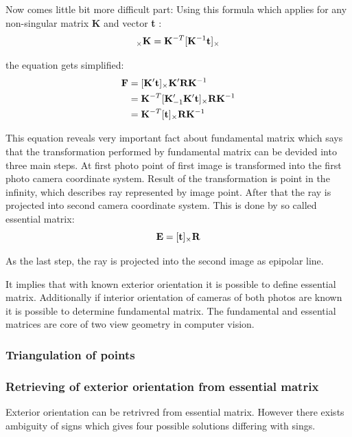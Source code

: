 \documentclass[a4paper,12pt]{report}
\newcommand{\ematr}[1]{
{\bf #1}
}
\newcommand{\evect}[1]{
{\bf #1}
}
\begin{document}
Now comes little bit more difficult part:
Using this formula which applies for any non-singular matrix \ematr{K} and vector \evect{t}:
\begin{equation}
[\evect{t}]_{\times} \ematr{K} = \ematr{K}^{-T}[\ematr{K}^{-1}\evect{t}]_{\times}
\end{equation}

the equation gets simplified:
\begin{equation}
\begin{split}
\ematr{F}  &= [\ematr{K}' \evect{t}]_{\times} \ematr{K}' \ematr{R} \ematr{K}^{-1} \\
	   &= \ematr{K}^{-T} [\ematr{K}'_{-1} \ematr{K}' \evect{t}]_{\times} \ematr{R} \ematr{K}^{-1} \\
	   &= \ematr{K}^{-T} [\evect{t}]_{\times} \ematr{R} \ematr{K}^{-1}
\end{split}
\end{equation}

This equation reveals very important fact about fundamental matrix which says that the transformation performed 
by fundamental matrix can be devided into three main steps.
At first photo point of first image is transformed into the first photo camera coordinate system. Result of the transformation is 
point in the infinity, which describes ray represented by image point. 
After that the ray is projected into second camera coordinate system. This is done by so called essential matrix:
\begin{equation}
	 \ematr{E}  = [\evect{t}]_{\times} \ematr{R}
\end{equation}


As the last step, the ray is projected into the second image as epipolar line.


It implies that with known exterior orientation it is possible to define essential matrix. 
Additionally if interior orientation of cameras of both photos are known it is possible to determine fundamental matrix. 
The fundamental and essential matrices are core of two view geometry in computer vision.

\subsubsection{Triangulation of points}
\label{sec:triang}

\subsubsection{Retrieving of exterior orientation from essential matrix}
\label{sec:ess_eo}
Exterior orientation
can be retrivred from essential matrix. However there exists ambiguity of signs which gives 
four possible solutions differing with sings.
\end{document}
